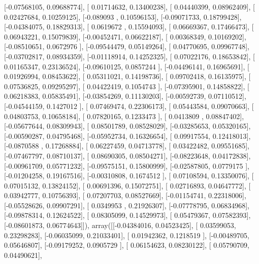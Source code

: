 \documentclass{article}
\begin{document}
       [-0.07568105,  0.09688774],
       [ 0.01714632,  0.13400238],
       [ 0.04440399,  0.08962409],
       [ 0.02427684,  0.10259125],
       [-0.089093  ,  0.10596153],
       [-0.09071733,  0.18799428],
       [-0.04384075,  0.18829313],
       [ 0.0619672 ,  0.15594093],
       [ 0.06669367,  0.17466473],
       [ 0.06943221,  0.15079839],
       [-0.00452471,  0.06622187],
       [ 0.00368349,  0.10169202],
       [-0.08510651,  0.0672976 ],
       [-0.09544479,  0.05149264],
       [ 0.04770695,  0.09967748],
       [-0.03702817,  0.08934359],
       [-0.01118914,  0.14252325],
       [ 0.07022176,  0.18653842],
       [ 0.01165347,  0.23136524],
       [-0.09610125,  0.0857244 ],
       [-0.04496141,  0.16965691],
       [ 0.01926994,  0.08453622],
       [ 0.05311021,  0.14198736],
       [ 0.09702418,  0.16135975],
       [ 0.07536825,  0.09295297],
       [ 0.04422419,  0.1054743 ],
       [-0.07395901,  0.14858822],
       [ 0.06218383,  0.05835491],
       [-0.03854269,  0.11130203],
       [-0.00592739,  0.07110512],
       [-0.04544159,  0.1427012 ],
       [ 0.07469474,  0.22306173],
       [ 0.05443584,  0.09070663],
       [ 0.04803753,  0.10658184],
       [ 0.07820165,  0.1233473 ],
       [ 0.0413809 ,  0.08847402],
       [-0.05677644,  0.08309943],
       [ 0.08501789,  0.08528029],
       [-0.03285653,  0.05320165],
       [-0.00590287,  0.04795468],
       [-0.05952734,  0.16326654],
       [ 0.09917554,  0.12418013],
       [-0.0870588 ,  0.17268884],
       [ 0.06227459,  0.04713778],
       [ 0.03422482,  0.09551685],
       [-0.07467797,  0.08710137],
       [ 0.08690305,  0.08504271],
       [-0.08223648,  0.04172838],
       [-0.00961709,  0.05771232],
       [-0.09575151,  0.15800999],
       [-0.02587805,  0.0779175 ],
       [-0.01204258,  0.19167516],
       [-0.00310808,  0.1674512 ],
       [ 0.07108594,  0.13350076],
       [ 0.07015132,  0.13824152],
       [ 0.00691396,  0.15072751],
       [ 0.02716893,  0.04647772],
       [ 0.03942777,  0.10756393],
       [ 0.07207703,  0.08527669],
       [-0.01154741,  0.22318006],
       [-0.05528626,  0.09907291],
       [ 0.0349953 ,  0.21926307],
       [-0.07778795,  0.06834968],
       [-0.09878314,  0.12624522],
       [ 0.08305099,  0.14529973],
       [ 0.05479367,  0.07582393],
       [-0.08601873,  0.06774643]]), array([[-0.04384016,  0.04523425],
       [ 0.03599053,  0.23298283],
       [-0.06035099,  0.21033401],
       [ 0.01942362,  0.1218519 ],
       [-0.00489705,  0.05646807],
       [-0.09179252,  0.0905729 ],
       [ 0.06154623,  0.08230122],
       [ 0.05790709,  0.04490621],
\end{document}
